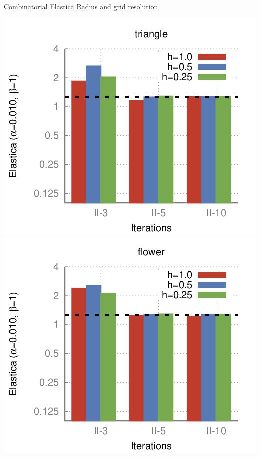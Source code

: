 \begin{frame}
	{Combinatorial Elastica}
	{Radius and grid resolution}
	
\begin{minipage}{0.49\textwidth}
\center
\includegraphics[scale=0.25]{figures/combinatorial-elastica/flow/ii/elastica/len_pen_0.01000/jonctions_1/curve_segs_4/best/gs_0.25000/triangle-bars.png}\\[0.6em]
\includegraphics[scale=0.25]{figures/combinatorial-elastica/flow/ii/elastica/len_pen_0.01000/jonctions_1/curve_segs_4/best/gs_0.25000/flower-bars.png}

\end{minipage}
\end{frame}
